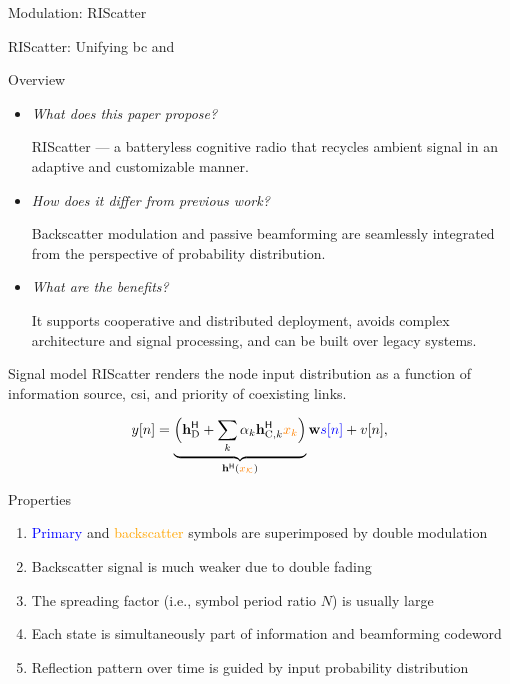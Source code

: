 \documentclass[presentation,xcolor={table},9pt]{beamer}
\begin{document}
\begin{section}{Modulation: RIScatter}
	\begin{frame}{RIScatter: Unifying \gls{bc} and }
		\begin{block}{Overview}
			\begin{itemize}\setlength\itemsep{20pt}
				\item \textit{What does this paper propose?}

				RIScatter --- a batteryless cognitive radio that recycles ambient signal in an adaptive and customizable manner.
				\item \textit{How does it differ from previous work?}

				Backscatter modulation and passive beamforming are seamlessly integrated from the perspective of probability distribution.
				\item \textit{What are the benefits?}

				It supports cooperative and distributed deployment, avoids complex architecture and signal processing, and can be built over legacy systems.
			\end{itemize}
		\end{block}
	\end{frame}

	\begin{frame}{Signal model}
		RIScatter renders the node input distribution as a function of information source, \gls{csi}, and priority of coexisting links.
		\begin{figure}[H]
			\centering
			\def\svgwidth{0.6\columnwidth}
			
			\label{fg:riscatter_network}
		\end{figure}
		\begin{equation*}
			y[n] = \underbrace{\Bigl(\mathbf{h}_{\text{D}}^\mathsf{H} + \sum_{k} \alpha_k \mathbf{h}_{\text{C},k}^\mathsf{H} \textcolor{orange}{x_k}\Bigr)}_{\mathbf{h}^\mathsf{H}(\textcolor{orange}{x_{\mathcal{K}}})} \mathbf{w} \textcolor{blue}{s[n]} + v[n],
		\end{equation*}
		\vspace{-0.25cm}
		\begin{block}{Properties}
			\begin{enumerate}
				\item \textcolor{blue}{Primary} and \textcolor{orange}{backscatter} symbols are superimposed by {double modulation}
				\item Backscatter signal is much weaker due to {double fading}
				\item The spreading factor (i.e., symbol period ratio $N$) is usually large
				\item Each {state} is simultaneously part of information and beamforming {codeword}
				\item Reflection pattern over time is guided by input probability distribution
			\end{enumerate}
		\end{block}
	\end{frame}


\end{section}
\end{document}
